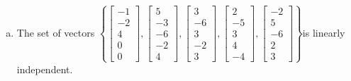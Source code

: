 \begin{exerciseAnswer}
\begin{enumerate}[(a)]
\item  The set of vectors \( \left\{ \left[\begin{array}{c}
-1 \\
-2 \\
4 \\
0 \\
0
\end{array}\right] , \left[\begin{array}{c}
5 \\
-3 \\
-6 \\
-2 \\
4
\end{array}\right] , \left[\begin{array}{c}
3 \\
-6 \\
3 \\
-2 \\
3
\end{array}\right] , \left[\begin{array}{c}
2 \\
-5 \\
3 \\
4 \\
-4
\end{array}\right] , \left[\begin{array}{c}
-2 \\
5 \\
-6 \\
2 \\
3
\end{array}\right] \right\} \)is linearly independent.
\end{enumerate}
    
\end{exerciseAnswer}
    
